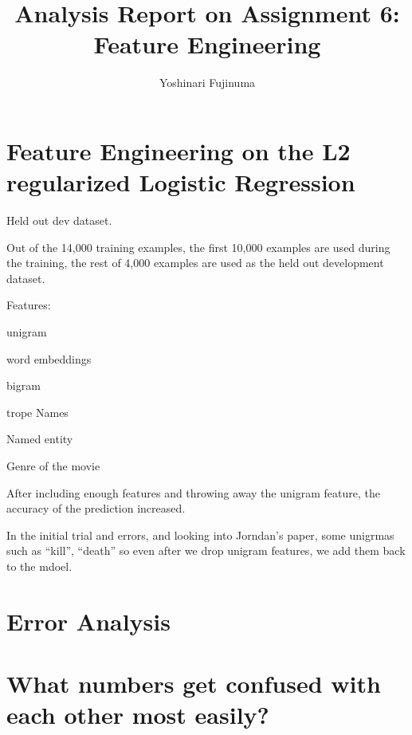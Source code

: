 \documentclass[11pt]{article}
\begin{document}
\title{Analysis Report on Assignment 6: Feature Engineering}
\author{Yoshinari Fujinuma}
\date{}
\maketitle

\section{Feature Engineering on the L2 regularized Logistic Regression}
Held out dev dataset.

Out of the 14,000 training examples, the first 10,000 examples are used during the training, the rest of 4,000 examples are used as the held out development dataset.

Features:

unigram

word embeddings

bigram

trope Names

Named entity 

Genre of the movie


After including enough features and throwing away the unigram feature, the accuracy of the prediction increased.

In the initial trial and errors, and looking into Jorndan's paper, some unigrmas such as ``kill'', ``death'' so even after we drop unigram features, we add them back to the mdoel.



\section{Error Analysis}
%
%   
%
%
%

\section{What numbers get confused with each other most easily?}
\end{document}
